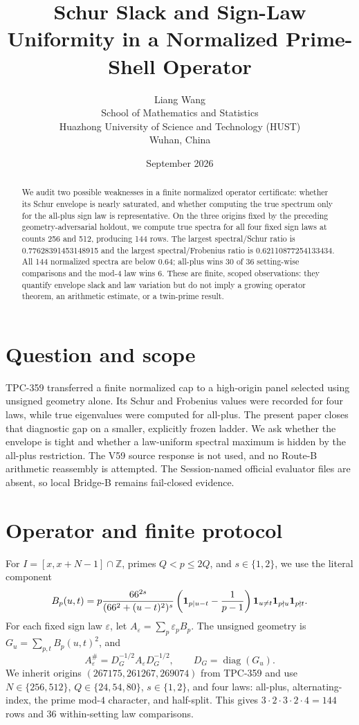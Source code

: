 \documentclass[10pt]{article}
\title{Schur Slack and Sign-Law Uniformity in a Normalized Prime-Shell Operator}
\author{Liang Wang\\
\small School of Mathematics and Statistics\\
\small Huazhong University of Science and Technology (HUST)\\
\small Wuhan, China}
\date{September 2026}
\begin{document}
\maketitle

\begin{abstract}
We audit two possible weaknesses in a finite normalized operator certificate:
whether its Schur envelope is nearly saturated, and whether computing the
true spectrum only for the all-plus sign law is representative.  On the three
origins fixed by the preceding geometry-adversarial holdout, we compute true
spectra for all four fixed sign laws at counts 256 and 512, producing 144
rows.  The largest spectral/Schur ratio is 0.77628391453148915 and the largest
spectral/Frobenius ratio is 0.62110877254133434.  All 144 normalized spectra
are below 0.64; all-plus wins 30 of 36 setting-wise comparisons and the mod-4
law wins 6.  These are finite, scoped observations: they quantify envelope
slack and law variation but do not imply a growing operator theorem, an
arithmetic estimate, or a twin-prime result.
\end{abstract}

\section{Question and scope}

TPC-359 transferred a finite normalized cap to a high-origin panel selected
using unsigned geometry alone.  Its Schur and Frobenius values were recorded
for four laws, while true eigenvalues were computed for all-plus.  The present
paper closes that diagnostic gap on a smaller, explicitly frozen ladder.  We
ask whether the envelope is tight and whether a law-uniform spectral maximum
is hidden by the all-plus restriction.  The V59 source response is not used,
and no Route-B arithmetic reassembly is attempted.  The Session-named official
evaluator files are absent, so local Bridge-B remains fail-closed evidence.

\section{Operator and finite protocol}

For $I=[x,x+N-1]\cap\mathbb Z$, primes $Q<p\leq2Q$, and $s\in\{1,2\}$,
we use the literal component
\begin{equation}
 B_p(u,t)=p\frac{66^{2s}}{(66^2+(u-t)^2)^s}
 \left({\bf1}_{p\mid u-t}-\frac1{p-1}\right)
 {\bf1}_{u\ne t}{\bf1}_{p\nmid u}{\bf1}_{p\nmid t}.
 \label{eq:block}
\end{equation}
For each fixed sign law $\varepsilon$, let $A_\varepsilon=\sum_p\varepsilon_pB_p$.
The unsigned geometry is $G_u=\sum_{p,t}B_p(u,t)^2$, and
\begin{equation}
 A_\varepsilon^\#=D_G^{-1/2}A_\varepsilon D_G^{-1/2},
 \qquad D_G=\operatorname{diag}(G_u).
 \label{eq:norm}
\end{equation}
We inherit origins $(267175,261267,269074)$ from TPC-359 and use
$N\in\{256,512\}$, $Q\in\{24,54,80\}$, $s\in\{1,2\}$, and four laws:
all-plus, alternating-index, the prime mod-$4$ character, and half-split.
This gives $3\cdot2\cdot3\cdot2\cdot4=144$ rows and 36 within-setting
law comparisons.
\end{document}
